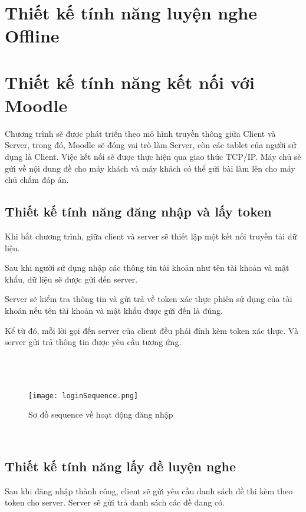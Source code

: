 \section{Thiết kế tính năng luyện nghe Offline}



\section{Thiết kế tính năng kết nối với Moodle}

Chương trình sẽ được phát triển theo mô hình truyền thông giữa Client và Server, trong đó, Moodle sẽ đóng vai trò làm Server, còn các tablet của người sử dụng là Client. Việc kết nối sẽ được thực hiện qua giao thức TCP/IP. Máy chủ sẽ gửi về nội dung đề cho máy khách và máy khách có thể gửi bài làm lên cho máy chủ chấm đáp án.
\subsection{Thiết kế tính năng đăng nhập và lấy token}

Khi bắt chương trình, giữa client và server sẽ thiết lập một kết nối truyền tải dữ liệu.

Sau khi người sử dụng nhập các thông tin tài khoản như tên tài khoản và mật khẩu, dữ liệu sẽ được gửi đến server.

Server sẽ kiểm tra thông tin và gửi trả về token xác thực phiên sử dụng của tài khoản nếu tên tài khoản và mật khẩu được gửi đến là đúng.

Kể từ đó, mỗi lời gọi đến server của client đều phải đính kèm token xác thực. Và server gửi trả thông tin được yêu cầu tương ứng.\\
\\
\\
\\
\begin{figure}[!htb] 
\centering
\texttt{[image: loginSequence.png]}
\caption{Sơ đồ sequence về hoạt động đăng nhập}
\end{figure}
\\

\subsection{Thiết kế tính năng lấy đề luyện nghe}

Sau khi đăng nhập thành công, client sẽ gửi yêu cầu danh sách đề thi kèm theo token cho server. Server sẽ gửi trả danh sách các đề đang có.

